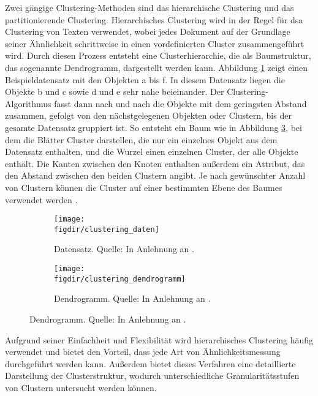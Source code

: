 Zwei gängige Clustering-Methoden sind das hierarchische Clustering und das partitionierende Clustering. Hierarchisches Clustering wird in der Regel für dsa Clustering von Texten verwendet, wobei jedes Dokument auf der Grundlage seiner Ähnlichkeit schrittweise in einen vordefinierten Cluster zusammengeführt wird. Durch diesen Prozess entsteht eine Clusterhierarchie, die als Baumstruktur, das sogenannte Dendrogramm, dargestellt werden kann. Abbildung \ref{f:clustering_daten} zeigt einen Beispieldatensatz mit den Objekten a bis f. In diesem Datensatz liegen die Objekte b und c sowie d und e sehr nahe beieinander. Der Clustering-Algorithmus fasst dann nach und nach die Objekte mit dem geringsten Abstand zusammen,  gefolgt von den nächstgelegenen Objekten oder Clustern, bis der gesamte Datensatz gruppiert ist. So entsteht ein Baum wie in Abbildung \ref{f:clustering_baum}, bei dem die Blätter Cluster darstellen, die nur ein einzelnes Objekt aus dem Datensatz enthalten, und die Wurzel einen einzelnen Cluster, der alle Objekte enthält. Die Kanten zwischen den Knoten enthalten außerdem ein Attribut, das den Abstand zwischen den beiden Clustern angibt. Je nach gewünschter Anzahl von Clustern können die Cluster auf einer bestimmten Ebene des Baumes verwendet werden \cite{Suyal.2014}.

\begin{figure}[htbp]
    \centering
    \begin{subfigure}[b]{0.47\linewidth}
        \texttt{[image: \\figdir/clustering\_daten]}
        \caption{Datensatz. Quelle: In Anlehnung an \cite{Bonthu.2023}.}
        \label{f:clustering_daten}
    \end{subfigure}
    \hfill
    \begin{subfigure}[b]{0.47\linewidth}
        \texttt{[image: \\figdir/clustering\_dendrogramm]}
        \caption{Dendrogramm. Quelle: In Anlehnung an \cite{Bonthu.2023}.}
        \label{f:clustering_baum}
    \end{subfigure}
\end{figure}

Aufgrund seiner Einfachheit und Flexibilität wird hierarchisches Clustering häufig verwendet und bietet den Vorteil, dass jede Art von Ähnlichkeitsmessung durchgeführt werden kann. Außerdem bietet dieses Verfahren eine detaillierte Darstellung der Clusterstruktur, wodurch unterschiedliche Granularitätsstufen von Clustern untersucht werden können.


